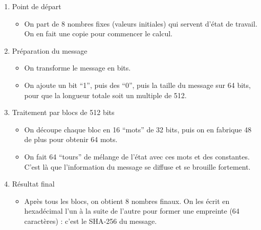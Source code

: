 \documentclass[11pt]{article}
\providecommand{\tightlist}{%
      \setlength{\itemsep}{0pt}\setlength{\parskip}{0pt}}
\begin{document}
\begin{enumerate}
\def\labelenumi{\arabic{enumi})}
\tightlist
\item
  Point de départ

  \begin{itemize}
  \tightlist
  \item
    On part de 8 nombres fixes (valeurs initiales) qui servent d'état de
    travail. On en fait une copie pour commencer le calcul.
  \end{itemize}
\item
  Préparation du message

  \begin{itemize}
  \tightlist
  \item
    On transforme le message en bits.
  \item
    On ajoute un bit ``1'', puis des ``0'', puis la taille du message
    sur 64 bits, pour que la longueur totale soit un multiple de 512.
  \end{itemize}
\item
  Traitement par blocs de 512 bits

  \begin{itemize}
  \tightlist
  \item
    On découpe chaque bloc en 16 ``mots'' de 32 bits, puis on en
    fabrique 48 de plus pour obtenir 64 mots.
  \item
    On fait 64 ``tours'' de mélange de l'état avec ces mots et des
    constantes. C'est là que l'information du message se diffuse et se
    brouille fortement.
  \end{itemize}
\item
  Résultat final

  \begin{itemize}
  \tightlist
  \item
    Après tous les blocs, on obtient 8 nombres finaux. On les écrit en
    hexadécimal l'un à la suite de l'autre pour former une empreinte (64
    caractères) : c'est le SHA‑256 du message.
  \end{itemize}
\end{enumerate}
\end{document}
